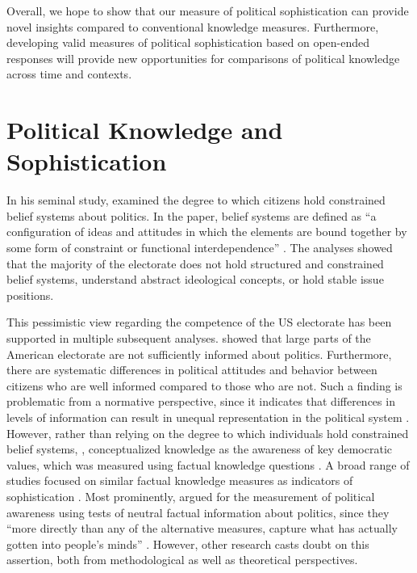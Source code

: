 \documentclass[12pt]{article}
\begin{document}
Overall, we hope to show that our measure of political sophistication can provide novel insights compared to conventional knowledge measures. Furthermore, developing valid measures of political sophistication based on open-ended responses will provide new opportunities for comparisons of political knowledge across time and contexts.


\section{Political Knowledge and Sophistication}

In his seminal study, \citet{converse1964nature} examined the degree to which citizens hold constrained belief systems about politics. In the paper, belief systems are defined as ``a configuration of ideas and attitudes in which the elements are bound together by some form of constraint or functional interdependence'' \citep[207]{converse1964nature}. The analyses showed that the majority of the electorate does not hold structured and constrained belief systems, understand abstract ideological concepts, or hold stable issue positions. 

This pessimistic view regarding the competence of the US electorate has been supported in multiple subsequent analyses. \citet{carpini1996americans} showed that large parts of the American electorate are not sufficiently informed about politics. Furthermore, there are systematic differences in political attitudes and behavior between citizens who are well informed compared to those who are not. Such a finding is problematic from a normative perspective, since it indicates that differences in levels of information can result in unequal representation in the political system \citep[see also][]{althaus1998information,kuklinski2000misinformation,gilens2001political}. However, rather than relying on the degree to which individuals hold constrained belief systems, \citet{carpini1996americans}, conceptualized knowledge as the awareness of key democratic values, which was measured using factual knowledge questions \citep[see also][]{carpini1993measuring}. A broad range of studies focused on similar factual knowledge measures as indicators of sophistication \citep[e.g.][]{zaller1991information,jacoby1995structure,gomez2001political}. Most prominently, \citet{zaller1992nature} argued for the measurement of political awareness using tests of neutral factual information about politics, since they ``more directly than any of the alternative measures, capture what has actually gotten into people’s minds'' \citep[21]{zaller1992nature}. However, other research casts doubt on this assertion, both from methodological as well as theoretical perspectives.
\end{document}
